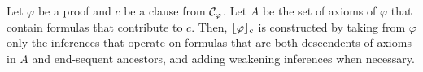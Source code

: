 

\begin{definition} %
\label{definition:OProjection}
Let $\varphi$ be a proof and $c$ be a clause from $\mathcal{C}_{\varphi}$. Let $A$ be the set of axioms of $\varphi$ that contain formulas that contribute to $c$. Then, $\lfloor \varphi \rfloor_{c}$ is constructed by taking from $\varphi$ only the inferences that operate on formulas that are both descendents of axioms in $A$ and end-sequent ancestors, and adding weakening inferences when necessary.
\end{definition}

